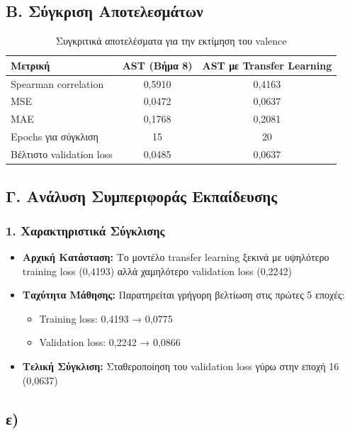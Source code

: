 \documentclass[a4paper,12pt]{article}
\begin{document}
\subsection*{Β. Σύγκριση Αποτελεσμάτων}

\begin{table}[H]
    \centering
    \begin{tabular}{lcc}
    \toprule
    \textbf{Μετρική} & \textbf{AST (Βήμα 8)} & \textbf{AST με Transfer Learning} \\
    \midrule
    Spearman correlation & 0,5910 & 0,4163 \\
    MSE & 0,0472 & 0,0637 \\
    MAE & 0,1768 & 0,2081 \\
    Epochs για σύγκλιση & 15 & 20 \\
    Βέλτιστο validation loss & 0,0485 & 0,0637 \\
    \bottomrule
    \end{tabular}
    \caption{Συγκριτικά αποτελέσματα για την εκτίμηση του valence}
\end{table}

\subsection*{Γ. Ανάλυση Συμπεριφοράς Εκπαίδευσης}

\subsubsection*{1. Χαρακτηριστικά Σύγκλισης}
\begin{itemize}
    \item \textbf{Αρχική Κατάσταση:} Το μοντέλο transfer learning ξεκινά με υψηλότερο training loss (0,4193) αλλά χαμηλότερο validation loss (0,2242)
    
    \item \textbf{Ταχύτητα Μάθησης:} Παρατηρείται γρήγορη βελτίωση στις πρώτες 5 εποχές:
    \begin{itemize}
        \item Training loss: 0,4193 → 0,0775
        \item Validation loss: 0,2242 → 0,0866
    \end{itemize}
    
    \item \textbf{Τελική Σύγκλιση:} Σταθεροποίηση του validation loss γύρω στην εποχή 16 (0,0637)
\end{itemize}


\subsection*{ε)}
\end{document}
